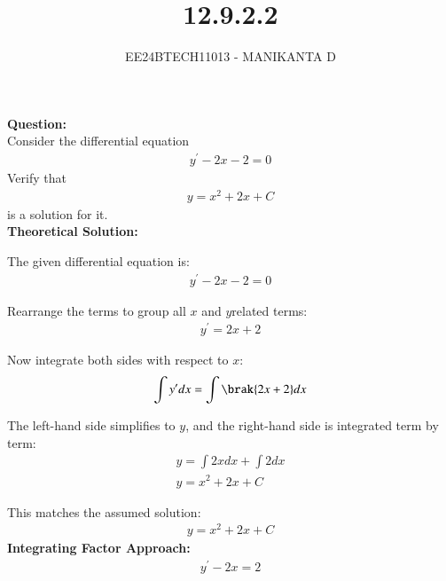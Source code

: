 \documentclass[journal]{IEEEtran}
\begin{document}

\vspace{3cm}

\title{12.9.2.2}
\author{EE24BTECH11013 - MANIKANTA D}
{\let\newpage\relax\maketitle}

\renewcommand{\thefigure}{\theenumi}
\renewcommand{\thetable}{\theenumi}
\setlength{\intextsep}{10pt} %


\renewcommand{\thetable}{\theenumi}

\textbf{Question:}\\
Consider the differential equation 
\begin{align}
    y^\prime - 2x - 2 = 0
\end{align}
Verify that
\begin{align}
    y = x^2 + 2x + C
\end{align}
is a solution for it.\\
\textbf{Theoretical Solution:}

The given differential equation is:
\begin{align}
    y^\prime - 2x - 2 = 0
\end{align}

Rearrange the terms to group all  $x$ and $y$related terms:
\begin{align}
    y^\prime = 2x + 2
\end{align}

Now integrate both sides with respect to $x$:
\begin{align}
    \int y^\prime dx = \int \brak{2x + 2} dx
\end{align}

The left-hand side simplifies to  $y$, and the right-hand side is integrated term by term:
\begin{align}
    y = \int 2x dx + \int 2 dx \\
    y = x^2 + 2x + C
\end{align}

This matches the assumed solution:
\begin{align}
    y = x^2 + 2x + C
\end{align}
\textbf{Integrating Factor Approach:}
\begin{align}
    y^\prime - 2x = 2
\end{align}
\end{document}
